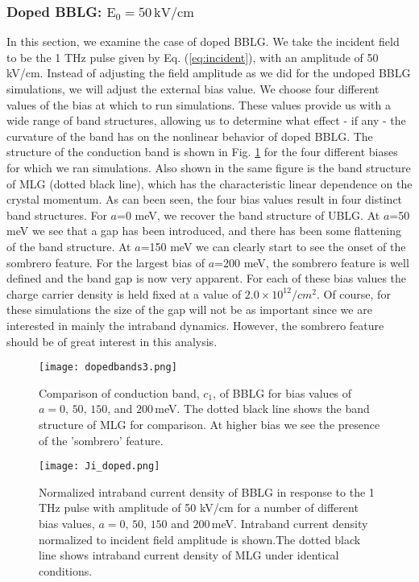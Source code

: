 \documentclass[twocolumn,secnumarabic,amssymb, nobibnotes, aps, prd, superscriptaddress]{revtex4-1}
\begin{document}
\subsubsection{Doped BBLG: $\textrm{E}_{0}=50\,\textrm{kV/cm}$}
In this section, we examine the case of doped BBLG. We take the incident field to be the 1 THz pulse given by Eq. (\ref{eq:incident}), with an amplitude of 50 kV/cm. Instead of adjusting the field amplitude as we did for the undoped BBLG simulations, we will adjust the external bias value. We choose four different values of the bias at which to run simulations. These values provide us with a wide range of band structures, allowing us to determine what effect - if any - the curvature of the band has on the nonlinear behavior of doped BBLG. The structure of the conduction band is shown in Fig. \ref{fig:5.10} for the four different biases for which we ran simulations. Also shown in the same figure is the band structure of MLG (dotted black line), which has the characteristic linear dependence on the crystal momentum. As can been seen, the four bias values result in four distinct band structures. For $a$=0 meV, we recover the band structure of UBLG. At $a$=50 meV we see that a gap has been introduced, and there has been some flattening of the band structure. At $a$=150 meV we can clearly start to see the onset of the sombrero feature. For the largest bias of $a$=200 meV, the sombrero feature is well defined and the band gap is now very apparent.  For each of these bias values the charge carrier density is held fixed at a value of $2.0\times10^{12}/cm^{2}$. Of course, for these simulations the size of the gap will not be as important since we are interested in mainly the intraband dynamics. However, the sombrero feature should be of great interest in this analysis.

\begin{figure}
\centering
\texttt{[image: dopedbands3.png]}
\caption{Comparison of conduction band, $c_{1}$, of BBLG for bias values of $a=0,\,50,\,150$, and $200\,$meV. The dotted black line shows the band structure of MLG for comparison. At higher bias we see the presence of the 'sombrero' feature.}\label{fig:5.10}
\end{figure}

\begin{figure}
\centering
\texttt{[image: Ji\_doped.png]}
\caption{Normalized intraband current density of BBLG in response to the 1 THz pulse with amplitude of 50 kV/cm for a number of different bias values, $a=0,\,50,\,150$ and $200\,$meV. Intraband current density normalized to incident field amplitude is shown.The dotted black line shows intraband current density of MLG under identical conditions.}\label{fig:5.10-2}
\end{figure}
\end{document}
